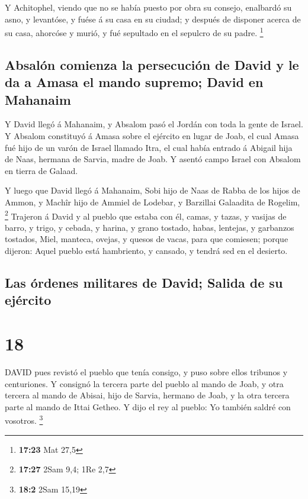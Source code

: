  Y Achitophel, viendo que no se había puesto por obra su
consejo, enalbardó su asno, y levantóse, y fuése á su casa en su ciudad;
y después de disponer acerca de su casa, ahorcóse y murió, y fué
sepultado en el sepulcro de su padre. \footnote{\textbf{17:23} Mat 27,5}

\hypertarget{absaluxf3n-comienza-la-persecuciuxf3n-de-david-y-le-da-a-amasa-el-mando-supremo-david-en-mahanaim}{%
\subsection{Absalón comienza la persecución de David y le da a Amasa el
mando supremo; David en
Mahanaim}\label{absaluxf3n-comienza-la-persecuciuxf3n-de-david-y-le-da-a-amasa-el-mando-supremo-david-en-mahanaim}}

 Y David llegó á Mahanaim, y Absalom pasó el Jordán con
toda la gente de Israel.  Y Absalom constituyó á Amasa
sobre el ejército en lugar de Joab, el cual Amasa fué hijo de un varón
de Israel llamado Itra, el cual había entrado á Abigail hija de Naas,
hermana de Sarvia, madre de Joab.  Y asentó campo Israel
con Absalom en tierra de Galaad.

 Y luego que David llegó á Mahanaim, Sobi hijo de Naas de
Rabba de los hijos de Ammon, y Machîr hijo de Ammiel de Lodebar, y
Barzillai Galaadita de Rogelim, \footnote{\textbf{17:27} 2Sam 9,4; 1Re
  2,7}  Trajeron á David y al pueblo que estaba con él,
camas, y tazas, y vasijas de barro, y trigo, y cebada, y harina, y grano
tostado, habas, lentejas, y garbanzos tostados,  Miel,
manteca, ovejas, y quesos de vacas, para que comiesen; porque dijeron:
Aquel pueblo está hambriento, y cansado, y tendrá sed en el desierto.

\hypertarget{las-uxf3rdenes-militares-de-david-salida-de-su-ejuxe9rcito}{%
\subsection{Las órdenes militares de David; Salida de su
ejército}\label{las-uxf3rdenes-militares-de-david-salida-de-su-ejuxe9rcito}}

\hypertarget{section-17}{%
\section{18}\label{section-17}}

 DAVID pues revistó el pueblo que tenía consigo, y puso
sobre ellos tribunos y centuriones.  Y consignó la tercera
parte del pueblo al mando de Joab, y otra tercera al mando de Abisai,
hijo de Sarvia, hermano de Joab, y la otra tercera parte al mando de
Ittai Getheo. Y dijo el rey al pueblo: Yo también saldré con vosotros.
\footnote{\textbf{18:2} 2Sam 15,19}

